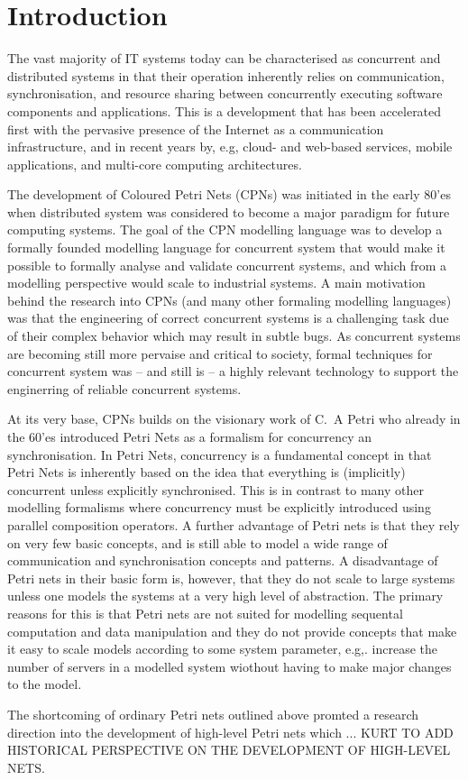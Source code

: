 \section{Introduction}

The vast majority of IT systems today can be characterised as
concurrent and distributed systems in that their operation inherently
relies on communication, synchronisation, and resource sharing between
concurrently executing software components and applications. This is a
development that has been accelerated first with the pervasive
presence of the Internet as a communication infrastructure, and in
recent years by, e.g, cloud- and web-based services, mobile
applications, and multi-core computing architectures.


The development of Coloured Petri Nets (CPNs) was initiated in the
early 80'es when distributed system was considered to become a major
paradigm for future computing systems. The goal of the CPN modelling
language was to develop a formally founded modelling language for
concurrent system that would make it possible to formally analyse and
validate concurrent systems, and which from a modelling perspective
would scale to industrial systems. A main motivation behind the
research into CPNs (and many other formaling modelling languages) was
that the engineering of correct concurrent systems is a challenging
task due of their complex behavior which may result in subtle bugs. As
concurrent systems are becoming still more pervaise and critical to
society, formal techniques for concurrent system was -- and still is
-- a highly relevant technology to support the enginerring of reliable
concurrent systems.


At its very base, CPNs builds on the visionary work of C.~A Petri
\cite{X} who already in the 60'es introduced Petri Nets as a formalism
for concurrency an synchronisation. In Petri Nets, concurrency is a
fundamental concept in that Petri Nets is inherently based on the idea
that everything is (implicitly) concurrent unless explicitly
synchronised. This is in contrast to many other modelling formalisms
where concurrency must be explicitly introduced using parallel
composition operators. A further advantage of Petri nets is that they
rely on very few basic concepts, and is still able to model a wide
range of communication and synchronisation concepts and patterns. A
disadvantage of Petri nets in their basic form is, however, that they
do not scale to large systems unless one models the systems at a very
high level of abstraction. The primary reasons for this is that Petri
nets are not suited for modelling sequental computation and data
manipulation and they do not provide concepts that make it easy to
scale models according to some system parameter, e.g,. increase the
number of servers in a modelled system wiothout having to make major
changes to the model.

The shortcoming of ordinary Petri nets outlined above promted a
research direction into the development of high-level Petri nets which
... KURT TO ADD HISTORICAL PERSPECTIVE ON THE DEVELOPMENT OF
HIGH-LEVEL NETS.
